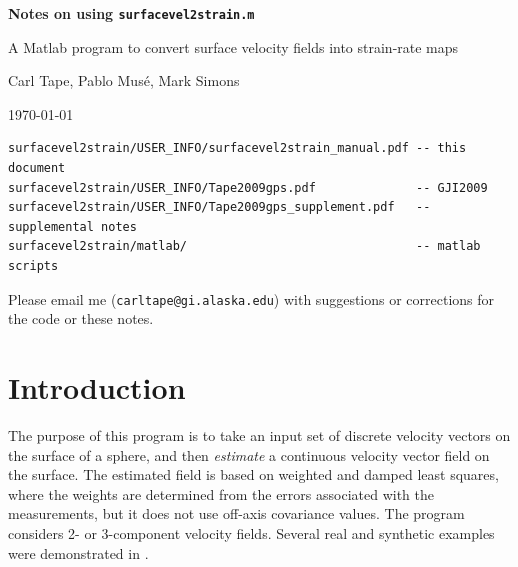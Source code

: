 \documentclass[11pt,titlepage,fleqn]{article}
\begin{document}

\begin{spacing}{1.5}
\begin{center}
{\large \bf Notes on using {\tt surfacevel2strain.m}

A Matlab program to convert surface velocity fields into strain-rate maps}
\end{center}
\end{spacing}

\bigskip
\noindent Carl Tape, Pablo Mus\'e, Mark Simons

\noindent \today

\small

\begin{verbatim}
surfacevel2strain/USER_INFO/surfacevel2strain_manual.pdf -- this document
surfacevel2strain/USER_INFO/Tape2009gps.pdf              -- GJI2009 
surfacevel2strain/USER_INFO/Tape2009gps_supplement.pdf   -- supplemental notes
surfacevel2strain/matlab/                                -- matlab scripts
\end{verbatim}


\bigskip\noindent
Please email me ({\tt carltape@gi.alaska.edu}) with suggestions or corrections for the code or these notes.


\section{Introduction}

The purpose of this program is to take an input set of discrete velocity vectors on the surface of a sphere, and then {\em estimate} a continuous velocity vector field on the surface. The estimated field is based on weighted and damped least squares, where the weights are determined from the errors associated with the measurements, but it does not use off-axis covariance values.  The program considers 2- or 3-component velocity fields. Several real and synthetic examples were demonstrated in \citet{Tape2009gps}.
\end{document}
